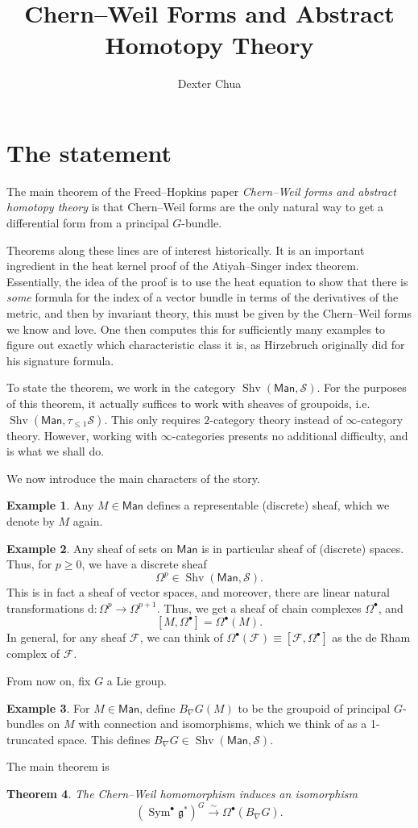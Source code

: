 \documentclass{shortart}
\title{Chern--Weil Forms and Abstract Homotopy Theory}
\author{Dexter Chua}
\newtheorem{thm}{Theorem}
\theoremstyle{definition}
\newtheorem{eg}[thm]{Example}
\DeclareMathOperator\Shv{Shv}
\DeclareMathOperator\Sym{Sym}
\newcommand\Man{\mathsf{Man}}
\renewcommand\S{\mathcal{S}}
\renewcommand\d{\mathrm{d}}
\begin{document}
\section{The statement}\label{section:statement}
The main theorem of the Freed--Hopkins paper \emph{Chern--Weil forms and abstract homotopy theory} is that Chern--Weil forms are the only natural way to get a differential form from a principal $G$-bundle.

Theorems along these lines are of interest historically. It is an important ingredient in the heat kernel proof of the Atiyah--Singer index theorem. Essentially, the idea of the proof is to use the heat equation to show that there is \emph{some} formula for the index of a vector bundle in terms of the derivatives of the metric, and then by invariant theory, this must be given by the Chern--Weil forms we know and love. One then computes this for sufficiently many examples to figure out exactly which characteristic class it is, as Hirzebruch originally did for his signature formula.

To state the theorem, we work in the category $\Shv(\Man, \S)$. For the purposes of this theorem, it actually suffices to work with sheaves of groupoids, i.e.\ $\Shv(\Man, \tau_{\leq 1} \S)$. This only requires $2$-category theory instead of $\infty$-category theory. However, working with $\infty$-categories presents no additional difficulty, and is what we shall do.

We now introduce the main characters of the story.
\begin{eg}
  Any $M \in \Man$ defines a representable (discrete) sheaf, which we denote by $M$ again.
\end{eg}

\begin{eg}
  Any sheaf of sets on $\Man$ is in particular sheaf of (discrete) spaces. Thus, for $p \geq 0$, we have a discrete sheaf
  \[
    \Omega^p \in \Shv(\Man, \S).
  \]
  This is in fact a sheaf of vector spaces, and moreover, there are linear natural transformations $\d: \Omega^p \to \Omega^{p + 1}$. Thus, we get a sheaf of chain complexes $\Omega^{\bullet}$, and
  \[
    [M, \Omega^\bullet] = \Omega^\bullet(M).
  \]
  In general, for any sheaf $\mathcal{F}$, we can think of $\Omega^\bullet (\mathcal{F}) \equiv [\mathcal{F}, \Omega^{\bullet}]$ as the de Rham complex of $\mathcal{F}$.
\end{eg}

From now on, fix $G$ a Lie group.
\begin{eg}
   For $M \in \Man$, define $B_\nabla G(M)$ to be the groupoid of principal $G$-bundles on $M$ with connection and isomorphisms, which we think of as a 1-truncated space. This defines $B_\nabla G \in \Shv(\Man, \S)$.
\end{eg}
The main theorem is
\begin{thm}
  The Chern--Weil homomorphism induces an isomorphism
  \[
    (\Sym^\bullet \mathfrak{g}^*)^G \overset{\sim}{\to} \Omega^\bullet (B_\nabla G).
  \]
\end{thm}
\end{document}

